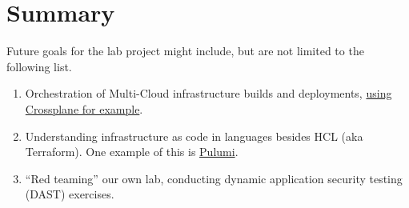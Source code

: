 \section{\label{sec:Summary}Summary}
\vspace{2mm}
Future goals for the lab project might include, but are not limited to the following list.
\vspace{2mm}
\begin{raggedright}
	\begin{enumerate}
		\item Orchestration of Multi-Cloud infrastructure builds and deployments, \href{https://crossplane.io/docs/v1.3/}{using Crossplane for example}.
		\item Understanding infrastructure as code in languages besides HCL (aka Terraform). One example of this is \href{https://www.pulumi.com/}{Pulumi}.
		\item ``Red teaming'' our own lab, conducting dynamic application security testing (DAST) exercises.
	\end{enumerate}
\end{raggedright}
\vspace{2mm}


\clearpage
\begin{versionhistory}
\end{versionhistory}
\nocite{*}





